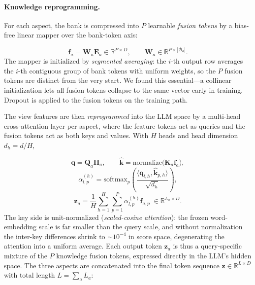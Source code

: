\paragraph{Knowledge reprogramming.}
For each aspect, the bank is compressed into $P$ learnable \emph{fusion
tokens} by a bias-free linear mapper over the bank-token axis:

\begin{equation}
  \mathbf{f}_a = \mathbf{W}_a \mathbf{E}_a \in \mathbb{R}^{P \times D},
  \qquad \mathbf{W}_a \in \mathbb{R}^{P \times |\mathcal{B}_a|}.
\end{equation}
The mapper is initialized by \emph{segmented averaging}: the $i$-th output
row averages the $i$-th contiguous group of bank tokens with uniform
weights, so the $P$ fusion tokens are distinct from the very start. We found
this essential---a collinear initialization lets all fusion tokens collapse
to the same vector early in training. Dropout is applied to the fusion
tokens on the training path.

The view features are then \emph{reprogrammed} into the LLM space by a
multi-head cross-attention layer per aspect, where the feature tokens act as
queries and the fusion tokens act as both keys and values. With $H$ heads and
head dimension $d_h = d / H$,

\begin{equation}
  \mathbf{q} = \mathbf{Q}_a \mathbf{H}_a, \qquad
  \hat{\mathbf{k}} = \mathrm{normalize}\big(\mathbf{K}_a \mathbf{f}_a\big),
\end{equation}
\begin{equation}
  \alpha_{l,p}^{(h)} = \mathrm{softmax}_p\!\left(
    \frac{\langle \mathbf{q}_{l,h}, \hat{\mathbf{k}}_{p,h} \rangle}
         {\sqrt{d_h}} \right),
\end{equation}
\begin{equation}
  \mathbf{z}_a = \frac{1}{H} \sum_{h=1}^{H} \sum_{p=1}^{P}
    \alpha_{l,p}^{(h)} \mathbf{f}_{a,p} \;\in \mathbb{R}^{L_a \times D}.
\end{equation}
The key side is unit-normalized (\emph{scaled-cosine attention}): the frozen
word-embedding scale is far smaller than the query scale, and without
normalization the inter-key differences shrink to $\sim\!10^{-4}$ in score
space, degenerating the attention into a uniform average. Each output token
$\mathbf{z}_a$ is thus a query-specific mixture of the $P$ knowledge fusion
tokens, expressed directly in the LLM's hidden space. The three aspects are
concatenated into the final token sequence
$\mathbf{z} \in \mathbb{R}^{L \times D}$ with total length
$L = \sum_a L_a$:

